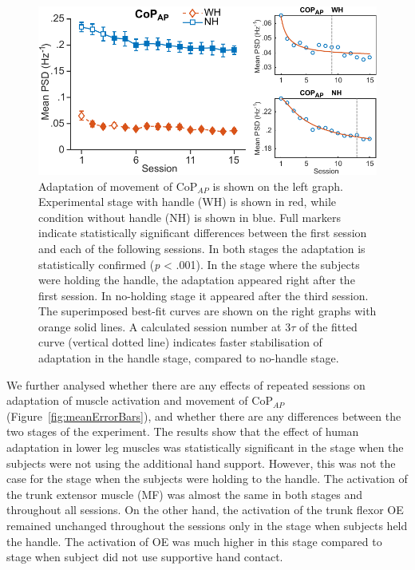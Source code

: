 \documentclass[final,5p,twocolumn]{elsarticle}
\begin{document}
\begin{figure}
	\begin{center}
		\includegraphics[width=\linewidth]{images/COPapAndTau.pdf}
		\caption{Adaptation of movement of CoP$_{AP}$ is shown on the left graph. Experimental stage with handle (WH) is shown in red, while condition without handle (NH) is shown in blue. Full markers indicate statistically significant differences between the first session and each of the following sessions. In both stages the adaptation is statistically confirmed (\textit{p} < .001). In the stage where the subjects were holding the handle, the adaptation appeared right after the first session. In no-holding stage it appeared after the third session. The superimposed best-fit curves are shown on the right graphs with orange solid lines. A calculated session number at 3$\tau$ of the fitted curve (vertical dotted line) indicates faster stabilisation of adaptation in the handle stage, compared to no-handle stage.}
		\label{fig:COPapAndTau}
	\end{center}
\end{figure}

We further analysed whether there are any effects of repeated sessions on adaptation of muscle activation and movement of CoP$_{AP}$ (Figure~\ref{fig:meanErrorBars}), and whether there are any differences between the two stages of the experiment. The results show that the effect of human adaptation in lower leg muscles was statistically significant in the stage when the subjects were not using the additional hand support. However, this was not the case for the stage when the subjects were holding to the handle. The activation of the trunk extensor muscle (MF) was almost the same in both stages and throughout all sessions. On the other hand, the activation of the trunk flexor OE remained unchanged throughout the sessions only in the stage when subjects held the handle. The activation of OE was much higher in this stage compared to stage when subject did not use supportive hand contact.
\end{document}
